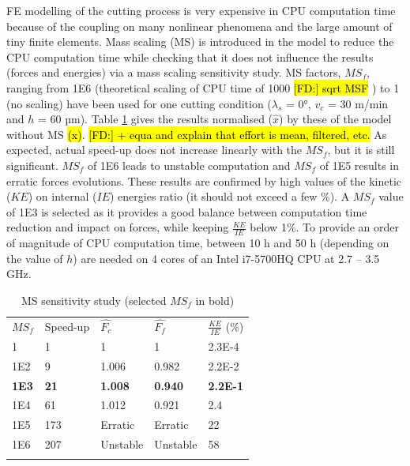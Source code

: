 \documentclass[final,5p,times,twocolumn]{elsarticle}
\DeclareRobustCommand{\FD}[1]{ {\begingroup\sethlcolor{VWgreen}\textcolor{black}{\hl{[FD:] #1}}\endgroup} }
\begin{document}
FE modelling of the cutting process is very expensive in CPU computation time because of the coupling on many nonlinear phenomena and the large amount of tiny finite elements. Mass scaling (MS) is introduced in the model to reduce the CPU computation time while checking that it does not influence the results (forces and energies) via a mass scaling sensitivity study.
MS factors, ${MS}_f$, ranging from 1E6 (theoretical scaling of CPU time of 1000\FD{sqrt MSF}) to 1 (no scaling) have been used for one cutting condition ($\lambda_s$ = 0°, $v_c$ = 30 m/min and $h$ = 60 µm). Table \ref{tab:MS} gives the results normalised ($\hat{x}$) by these of the model without MS \hl{(x)}.\FD{+ equa and explain that effort is mean, filtered, etc.} As expected, actual speed-up does not increase linearly with the ${MS}_f$, but it is still significant. ${MS}_f$ of 1E6 leads to unstable computation and ${MS}_f$ of 1E5 results in erratic forces evolutions. These results are confirmed by high values of the kinetic ($KE$) on internal ($IE$) energies ratio (it should not exceed a few \%). A ${MS}_f$ value of 1E3 is selected as it provides a good balance between computation time reduction and impact on forces, while keeping $\frac{KE}{IE}$ below 1\%. To provide an order of magnitude of CPU computation time, between 10 h and 50 h (depending on the value of $h$) are needed on 4 cores of an Intel i7-5700HQ CPU at 2.7 -- 3.5 GHz.

%
\begin{table}[!h]
\begin{center}
\caption{\label{tab:MS} MS sensitivity study (selected $MS_f$ in bold)}
\begin{tabular}{lllll}
\hline\noalign{\smallskip}
$MS_f$  & Speed-up & $\hat{F_c}$ & $\hat{F_f}$ & $\frac{KE}{IE}$ (\%)\\
\noalign{\smallskip}\hline\noalign{\smallskip}
1 & 1 & 1 & 1 & 2.3E-4\\
1E2 & 9 & 1.006 & 0.982 & 2.2E-2\\
\textbf{1E3} & \textbf{21} & \textbf{1.008} & \textbf{0.940} & \textbf{2.2E-1}\\
1E4 & 61 & 1.012 & 0.921 & 2.4\\
1E5 & 173 & Erratic & Erratic & 22\\
1E6 & 207 & Unstable & Unstable & 58\\
\noalign{\smallskip}\hline
\end{tabular}
\end{center}
\end{table}
%
\end{document}

